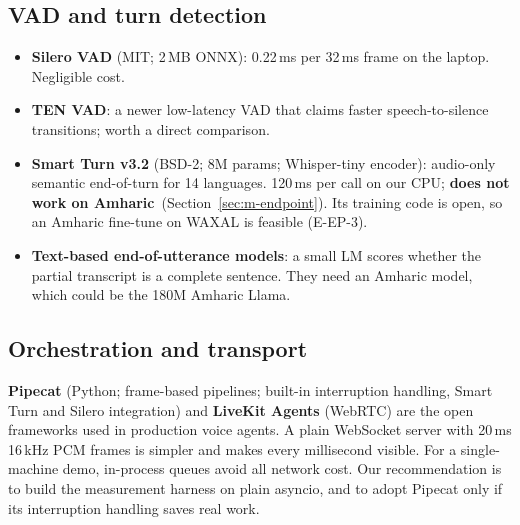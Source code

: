 \subsection{VAD and turn detection}
\begin{itemize}
  \item \textbf{Silero VAD} (MIT; 2\,MB ONNX): 0.22\,ms per 32\,ms frame on the laptop\meas. Negligible cost.
  \item \textbf{TEN VAD}: a newer low-latency VAD that claims faster speech-to-silence transitions; worth a direct comparison.
  \item \textbf{Smart Turn v3.2} (BSD-2; 8M params; Whisper-tiny encoder): audio-only semantic end-of-turn
  for 14 languages. 120\,ms per call on our CPU\meas; \textbf{does not work on Amharic}\meas\ (Section~\ref{sec:m-endpoint}).
  Its training code is open, so an Amharic fine-tune on WAXAL is feasible (E-EP-3).
  \item \textbf{Text-based end-of-utterance models}: a small LM scores whether the partial transcript
  is a complete sentence. They need an Amharic model, which could be the 180M Amharic Llama.
\end{itemize}

\subsection{Orchestration and transport}
\textbf{Pipecat} (Python; frame-based pipelines; built-in interruption handling, Smart Turn and Silero
integration) and \textbf{LiveKit Agents} (WebRTC) are the open frameworks used in production voice
agents. A plain  WebSocket server with 20\,ms 16\,kHz PCM frames is simpler and makes
every millisecond visible. For a single-machine demo, in-process queues avoid all network cost. Our
recommendation is to build the measurement harness on plain asyncio, and to adopt Pipecat only if its
interruption handling saves real work.
